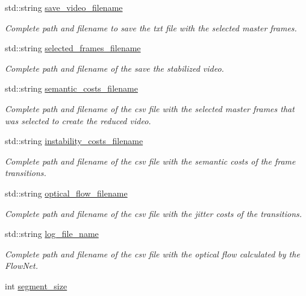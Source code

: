 \begin{DoxyCompactItemize}
std\+::string \hyperlink{structEXPERIMENT_a867146c43457a82a6b2346d8621d70b6}{save\+\_\+video\+\_\+filename}
\begin{DoxyCompactList}\small\item\em Complete path and filename to save the txt file with the selected master frames. \end{DoxyCompactList}\item 
std\+::string \hyperlink{structEXPERIMENT_aef88dd45b0ad1db5f6b68b0801f6f630}{selected\+\_\+frames\+\_\+filename}
\begin{DoxyCompactList}\small\item\em Complete path and filename of the save the stabilized video. \end{DoxyCompactList}\item 
std\+::string \hyperlink{structEXPERIMENT_ab71731194cb1680b25dd9ed253e455aa}{semantic\+\_\+costs\+\_\+filename}
\begin{DoxyCompactList}\small\item\em Complete path and filename of the csv file with the selected master frames that was selected to create the reduced video. \end{DoxyCompactList}\item 
std\+::string \hyperlink{structEXPERIMENT_a74bd001a4012183b8dacec4e79315a13}{instability\+\_\+costs\+\_\+filename}
\begin{DoxyCompactList}\small\item\em Complete path and filename of the csv file with the semantic costs of the frame transitions. \end{DoxyCompactList}\item 
std\+::string \hyperlink{structEXPERIMENT_a8b5ca464e785c2b80c16c9e022b7c31a}{optical\+\_\+flow\+\_\+filename}
\begin{DoxyCompactList}\small\item\em Complete path and filename of the csv file with the jitter costs of the transitions. \end{DoxyCompactList}\item 
std\+::string \hyperlink{structEXPERIMENT_ac3568164588c0366d26fc9cd69b98fe3}{log\+\_\+file\+\_\+name}
\begin{DoxyCompactList}\small\item\em Complete path and filename of the csv file with the optical flow calculated by the Flow\+Net. \end{DoxyCompactList}\item 
int \hyperlink{structEXPERIMENT_a004195c9cb30dde7a5cac231381503da}{segment\+\_\+size}

\end{DoxyCompactItemize}
